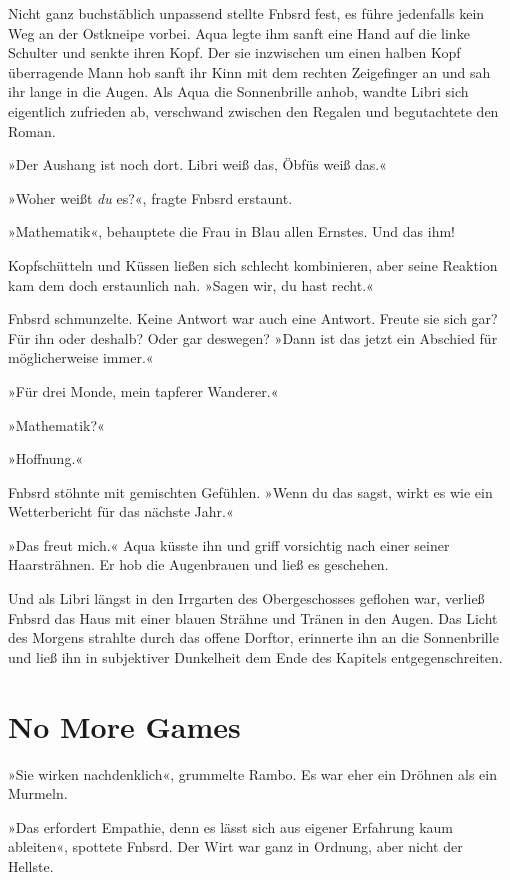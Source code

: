 Nicht ganz buchstäblich unpassend stellte Fnbsrd fest, es führe jedenfalls kein Weg an der Ostkneipe vorbei. Aqua legte ihm sanft eine Hand auf die linke Schulter und senkte ihren Kopf. Der sie inzwischen um einen halben Kopf überragende Mann hob sanft ihr Kinn mit dem rechten Zeigefinger an und sah ihr lange in die Augen. Als Aqua die Sonnenbrille anhob, wandte Libri sich eigentlich zufrieden ab, verschwand zwischen den Regalen und begutachtete den Roman.

»Der Aushang ist noch dort. Libri weiß das, Öbfüs weiß das.«

»Woher weißt \emph{du} es?«, fragte Fnbsrd erstaunt.

»Mathematik«, behauptete die Frau in Blau allen Ernstes. Und das ihm!

Kopfschütteln und Küssen ließen sich schlecht kombinieren, aber seine Reaktion kam dem doch erstaunlich nah. »Sagen wir, du hast recht.«


Fnbsrd schmunzelte. Keine Antwort war auch eine Antwort. Freute sie sich gar? Für ihn oder deshalb? Oder gar deswegen? »Dann ist das jetzt ein Abschied für möglicherweise immer.«

»Für drei Monde, mein tapferer Wanderer.«

»Mathematik?«

»Hoffnung.«

Fnbsrd stöhnte mit gemischten Gefühlen. »Wenn du das sagst, wirkt es wie ein Wetterbericht für das nächste Jahr.«

»Das freut mich.« Aqua küsste ihn und griff vorsichtig nach einer seiner Haarsträhnen. Er hob die Augenbrauen und ließ es geschehen.

Und als Libri längst in den Irrgarten des Obergeschosses geflohen war, verließ Fnbsrd das Haus mit einer blauen Strähne und Tränen in den Augen. Das Licht des Morgens strahlte durch das offene Dorftor, erinnerte ihn an die Sonnenbrille und ließ ihn in subjektiver Dunkelheit dem Ende des Kapitels entgegenschreiten.


\chapter{No More Games}

»Sie wirken nachdenklich«, grummelte Rambo. Es war eher ein Dröhnen als ein Murmeln.

»Das erfordert Empathie, denn es lässt sich aus eigener Erfahrung kaum ableiten«, spottete Fnbsrd. Der Wirt war ganz in Ordnung, aber nicht der Hellste.

